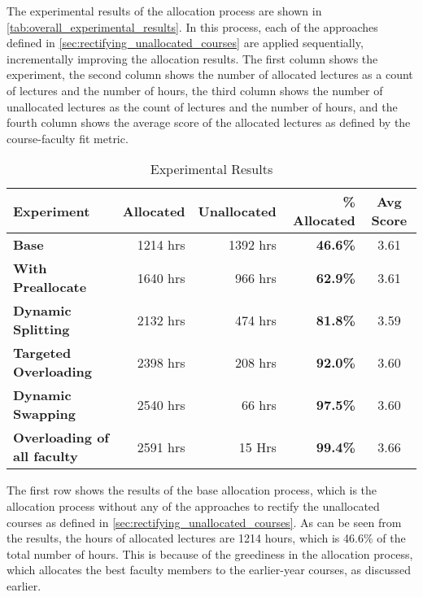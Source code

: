 The experimental results of the allocation process are shown in \autoref{tab:overall_experimental_results}. In this process, each of the approaches defined in \autoref{sec:rectifying_unallocated_courses} are applied sequentially, incrementally improving the allocation results. The first column shows the experiment, the second column shows the number of allocated lectures as a count of lectures and the number of hours, the third column shows the number of unallocated lectures as the count of lectures and the number of hours, and the fourth column shows the average score of the allocated lectures as defined by the course-faculty fit metric.

\begin{table}[H]
  \centering
  \begin{tabular}{|l|r|r|r|c|}
    \hline
    \textbf{Experiment}                 & \textbf{Allocated} & \textbf{Unallocated} & \textbf{\% Allocated} & \textbf{Avg Score} \\ \hline
    \textbf{Base}                       & 1214 hrs           & 1392 hrs             & \textbf{46.6\%}       & 3.61               \\ \hline
    \textbf{With Preallocate}           & 1640 hrs           & 966 hrs              & \textbf{62.9\%}       & 3.61               \\ \hline
    \textbf{Dynamic Splitting}          & 2132 hrs           & 474 hrs              & \textbf{81.8\%}       & 3.59               \\ \hline
    \textbf{Targeted Overloading}       & 2398 hrs           & 208 hrs              & \textbf{92.0\%}       & 3.60               \\ \hline
    \textbf{Dynamic Swapping}           & 2540 hrs           & 66 hrs               & \textbf{97.5\%}       & 3.60               \\ \hline
    \textbf{Overloading of all faculty} & 2591 hrs           & 15 Hrs               & \textbf{99.4\%}       & 3.66               \\ \hline
  \end{tabular}
  \caption{Experimental Results}
  \label{tab:overall_experimental_results}
\end{table}

The first row shows the results of the base allocation process, which is the allocation process without any of the approaches to rectify the unallocated courses as defined in  \autoref{sec:rectifying_unallocated_courses}. As can be seen from the results, the hours of allocated lectures are 1214 hours, which is 46.6\% of the total number of hours. This is because of the greediness in the allocation process, which allocates the best faculty members to the earlier-year courses, as discussed earlier.


